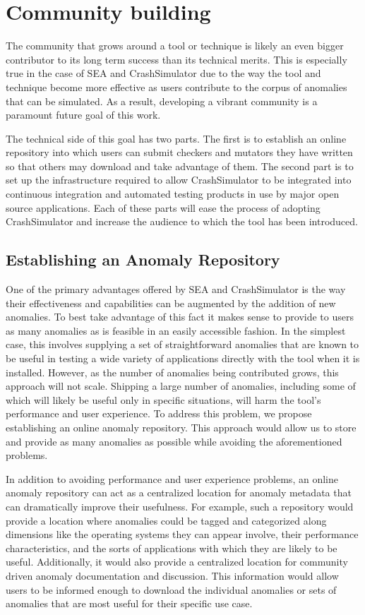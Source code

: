 \documentclass[twocolumn]{article}
\begin{document}
\section{Community building}

The community that grows around a tool or technique is likely an even
bigger contributor to its long term success than its technical merits.
This is especially true in the case of SEA and CrashSimulator due to the
way the tool and technique become more effective as users contribute to the
corpus of anomalies that can be simulated.  As a result, developing a
vibrant community is a paramount future goal of this work.

The technical side of this goal has two parts.  The first is to establish
an online repository into which users can submit checkers and mutators they
have written so that others may download and take advantage of them.  The
second part is to set up the infrastructure required to allow
CrashSimulator to be integrated into continuous integration and automated
testing products in use by major open source applications.  Each of these
parts will ease the process of adopting CrashSimulator and increase the
audience to which the tool has been introduced.

\subsection{Establishing an Anomaly Repository}

One of the primary advantages offered by SEA and CrashSimulator is the way
their effectiveness and capabilities can be augmented by the addition of
new anomalies.  To best take advantage of this fact it makes sense to
provide to users as many anomalies as is feasible in an easily accessible
fashion.  In the simplest case, this involves supplying a set of
straightforward anomalies that are known to be useful in testing a wide
variety of applications directly with the tool when it is installed.
However, as the number of anomalies being contributed grows, this approach
will not scale.  Shipping a large number of anomalies, including some of
which will likely be useful only in specific situations, will harm the
tool's performance and user experience.  To address this problem, we
propose establishing an online anomaly repository.  This approach would
allow us to  store and provide as many anomalies as possible while avoiding
the aforementioned problems.

In addition to avoiding performance and user experience problems, an online
anomaly repository can act as a centralized location for anomaly metadata
that can dramatically improve their usefulness. For example, such a
repository would provide a location where anomalies could be tagged and
categorized along dimensions like the operating systems they can appear
involve, their performance characteristics, and the sorts of applications
with which they are likely to be useful.  Additionally, it would also
provide a centralized location for community driven anomaly documentation
and discussion.  This information would allow users to be informed enough
to download the individual anomalies or sets of anomalies that are most
useful for their specific use case.
\end{document}
